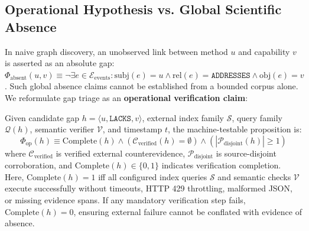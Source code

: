 \documentclass[runningheads]{llncs}
\begin{document}
\subsection{Operational Hypothesis vs. Global Scientific Absence}
In naive graph discovery, an unobserved link between method $u$ and capability $v$ is asserted as an absolute gap: $\Phi_{\text{absent}}(u, v) \equiv \neg \exists e \in \mathcal{E}_{\text{events}} : \text{subj}(e) = u \wedge \text{rel}(e) = \texttt{ADDRESSES} \wedge \text{obj}(e) = v$. Such global absence claims cannot be established from a bounded corpus alone. We reformulate gap triage as an \textbf{operational verification claim}:
\begin{definition}
Given candidate gap $h = \langle u, \texttt{LACKS}, v \rangle$, external index family $\mathcal{S}$, query family $\mathcal{Q}(h)$, semantic verifier $\mathcal{V}$, and timestamp $t$, the machine-testable proposition is:
\begin{equation}
\label{eq:operational_claim}
\Phi_{\text{op}}(h) \equiv \text{Complete}(h) \wedge \left( \mathcal{C}_{\text{verified}}(h) = \emptyset \right) \wedge \left( |\mathcal{P}_{\text{disjoint}}(h)| \ge 1 \right)
\end{equation}
where $\mathcal{C}_{\text{verified}}$ is verified external counterevidence, $\mathcal{P}_{\text{disjoint}}$ is source-disjoint corroboration, and $\text{Complete}(h) \in \{0, 1\}$ indicates verification completion. Here, $\text{Complete}(h) = 1$ iff all configured index queries $\mathcal{S}$ and semantic checks $\mathcal{V}$ execute successfully without timeouts, HTTP 429 throttling, malformed JSON, or missing evidence spans. If any mandatory verification step fails, $\text{Complete}(h) = 0$, ensuring external failure cannot be conflated with evidence of absence.
\end{definition}
\end{document}
